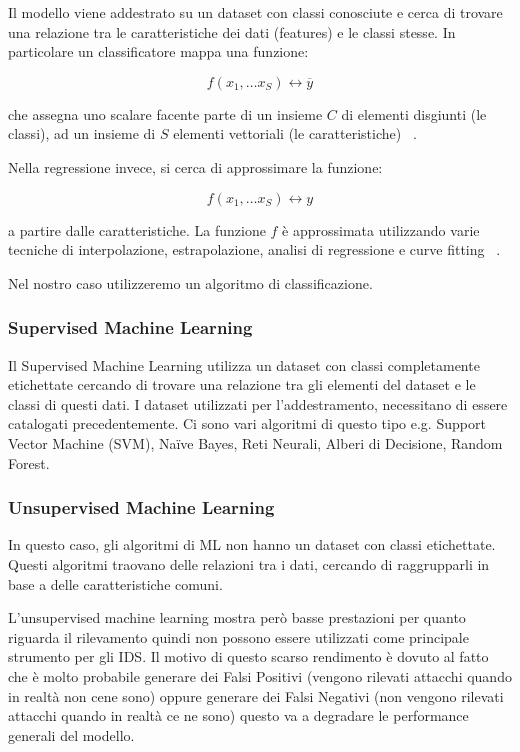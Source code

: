 Il modello viene addestrato su un dataset con classi conosciute e cerca di trovare una relazione tra le caratteristiche dei dati (features) e le classi stesse. 
In particolare un classificatore mappa una funzione: 

\[
  f(x_1,\ldots x_S) \leftrightarrow \overline{y}
\]

che assegna uno scalare facente parte di un insieme $C$ di elementi disgiunti (le classi), ad un insieme di $S$ elementi vettoriali (le caratteristiche) ~\cite{hoffmannBenchmarkingClassificationRegression2019}.


Nella regressione invece, si cerca di approssimare la funzione: 

\[
f(x_1,\ldots x_S) \leftrightarrow y
\]

a partire dalle caratteristiche. La funzione $f$ è approssimata utilizzando varie tecniche di interpolazione, estrapolazione, analisi di regressione e curve fitting ~\cite{hoffmannBenchmarkingClassificationRegression2019}.


Nel nostro caso utilizzeremo un algoritmo di classificazione.




\subsubsection{Supervised Machine Learning}

Il Supervised Machine Learning utilizza un dataset con classi completamente etichettate cercando di trovare una relazione tra gli elementi del dataset e le classi di questi dati. 
I dataset utilizzati per l'addestramento, necessitano di essere catalogati precedentemente.
Ci sono vari algoritmi di questo tipo e.g. Support Vector Machine (SVM), Naïve Bayes, Reti Neurali, Alberi di Decisione, Random Forest.


\subsubsection{Unsupervised Machine Learning}

In questo caso, gli algoritmi di ML non hanno un dataset con classi etichettate. Questi algoritmi traovano delle relazioni tra i dati, cercando di raggrupparli in base a delle caratteristiche comuni.

L'unsupervised machine learning mostra però basse prestazioni per quanto riguarda il rilevamento quindi non possono essere utilizzati come principale strumento per gli IDS. Il motivo di questo scarso rendimento è dovuto al fatto che è molto probabile generare dei Falsi Positivi (vengono rilevati attacchi quando in realtà non cene sono) oppure generare dei Falsi Negativi (non vengono rilevati attacchi quando in realtà ce ne sono) questo va a degradare le performance generali del modello.

